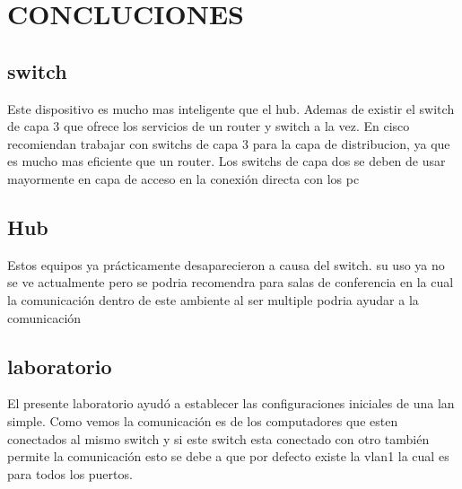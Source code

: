 \chapter{CONCLUCIONES}

\section{switch}

\begin{caja}[]{
 Este dispositivo es mucho mas inteligente que el hub. Ademas de existir el switch de capa 3 que ofrece los servicios de un router y switch a la vez. En cisco recomiendan trabajar con switchs de capa 3 para la capa de distribucion, ya que es mucho mas eficiente que un router. Los switchs de capa dos se deben de usar mayormente en capa de acceso en la conexi\'on directa con los pc
 }\end{caja}
 
 \section{Hub}

\begin{caja}[]{
Estos equipos ya pr\'acticamente desaparecieron a causa del switch. su uso ya no se ve actualmente pero se podria recomendra para salas de conferencia en la cual la comunicaci\'on dentro de este ambiente al ser multiple podria ayudar a la comunicaci\'on
 }\end{caja}
 
  \section{laboratorio}

\begin{caja}[]{
El presente laboratorio ayud\'o a establecer las configuraciones iniciales de una lan simple. 
Como vemos la comunicaci\'on es de los computadores que esten conectados al mismo switch y si este switch esta conectado con otro tambi\'en permite la comunicaci\'on esto se debe a que por defecto existe la vlan1 la cual es para todos los puertos.\\
 }\end{caja}